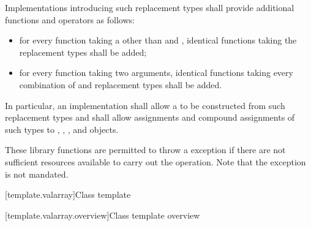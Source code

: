 \pnum
Implementations introducing such replacement types shall provide
additional functions and operators as follows:
\begin{itemize}
\item
for every function taking a
 other than  and
,
identical functions taking the replacement types shall be added;
\item
for every function taking two
arguments, identical functions taking every combination of
and replacement types shall be added.
\end{itemize}

\pnum
In particular, an implementation shall allow a
to be constructed from such replacement types and shall allow assignments
and compound assignments of such types to
,
,
,
and
objects.

\pnum
These library functions are permitted to throw a
 exception if there are not sufficient resources available
to carry out the operation.
Note that the exception is not mandated.

[template.valarray]{Class template }

[template.valarray.overview]{Class template  overview}

